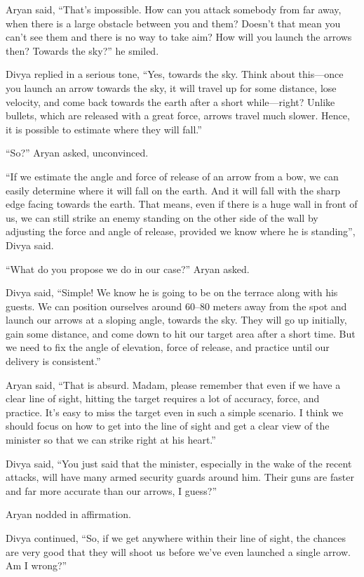 Aryan said, “That's impossible. How can you attack somebody from far away, when
there is a large obstacle between you and them? Doesn't that mean you can't
see them and there is no way to take aim? How will you launch the arrows then?
Towards the sky?” he smiled.

Divya replied in a serious tone, “Yes, towards the sky. Think about this—once
you launch an arrow towards the sky, it will travel up for some distance, lose
velocity, and come back towards the earth after a short while—right? Unlike
bullets, which are released with a great force, arrows travel much slower. Hence,
it is possible to estimate where they will fall.”

“So?” Aryan asked, unconvinced.

“If we estimate the angle and force of release of an arrow from a bow, we can
easily determine where it will fall on the earth. And it will fall
with the sharp edge facing towards the earth. That means, even if there is a
huge wall in front of us, we can still strike an enemy standing on the other
side of the wall by adjusting the force and angle of release, provided we know
where he is standing”, Divya said.

“What do you propose we do in our case?” Aryan asked.

Divya said, “Simple! We know he is going to be on the terrace along with his
guests. We can position ourselves around 60–80 meters away from the spot and
launch our arrows at a sloping angle, towards the sky. They will go up
initially, gain some distance, and come down to hit our target area after a
short time. But we need to fix the angle of elevation, force of release, and
practice until our delivery is consistent.”

Aryan said, “That is absurd. Madam, please remember that even if we have a clear
line of sight, hitting the target requires a lot of accuracy, force, and
practice. It's easy to miss the target even in such a simple scenario. I think
we should focus on how to get into the line of sight and get a clear view of the
minister so that we can strike right at his heart.”

Divya said, “You just said that the minister, especially in the wake of the
recent attacks, will have many armed security guards around him. Their guns
are faster and far more accurate than our arrows, I guess?”

Aryan nodded in affirmation.

Divya continued, “So, if we get anywhere within their line of sight, the chances
are very good that they will shoot us before we've even launched a single arrow.
Am I wrong?”

